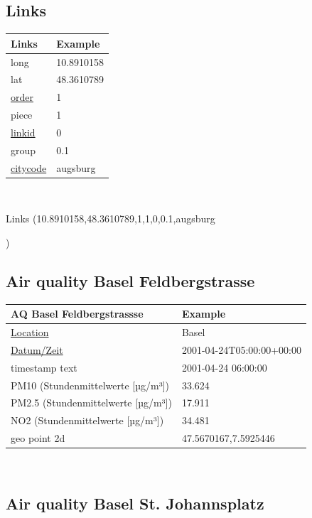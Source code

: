 \documentclass{article}
\begin{document}
\subsection{Links}

\begin{tabular}{ |p{5cm}| p{5cm}|  }
\hline
 Links & Example\\
 \hline
 long & 10.8910158\\
lat& 48.3610789\\
 \uline{order}& 1\\
 piece& 1\\
 \uline{linkid}& 0\\
group& 0.1\\
 \uline{citycode}& augsburg\\
 \hline
\end{tabular}\\



\begin{tabbing}
    Links (10.8910158,48.3610789,1,1,0,0.1,augsburg

)\\
\end{tabbing}

\subsection{Air quality Basel Feldbergstrasse}

\begin{tabular}{ |p{8cm}| p{5cm}| }
\hline
 AQ Basel Feldbergstrassse & Example\\
 \hline
 \uline{Location} & Basel\\
 \uline{Datum/Zeit} & 2001-04-24T05:00:00+00:00\\
timestamp text& 2001-04-24 06:00:00\\
 PM10 (Stundenmittelwerte [µg/m³])& 33.624 \\
 PM2.5 (Stundenmittelwerte [µg/m³])& 17.911\\
 NO2 (Stundenmittelwerte [µg/m³])& 34.481\\
geo point 2d  & 47.5670167,7.5925446\\
 \hline
\end{tabular}\\





\subsection{Air quality Basel St. Johannsplatz}
\end{document}
